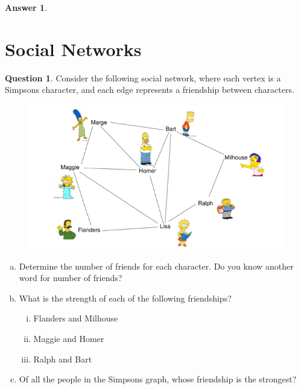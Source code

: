 \documentclass[article, 12pt]{article}
\theoremstyle{definition}
\newtheorem{question}{Question}
\newtheorem{answer}{Answer}
\begin{document}
\begin{answer}
\begin{figure}[H]
\begin{minipage}[b]{0.4\linewidth}
            \end{minipage}
        \end{figure}
    \end{answer}
    \section{Social Networks}
    \begin{question}
        Consider the following social network, where each vertex is a Simpsons character, and each edge represents a friendship between characters.
        \begin{figure}[H]
            \centering
            \includegraphics[width=0.8\linewidth]{simpsons.png}
        \end{figure}
        \begin{enumerate}[(a)]
            \item Determine the number of friends for each character. Do you know another word for number of friends?
            \item What is the strength of each of the following friendships?
            \begin{enumerate}[(i)]
                \item Flanders and Milhouse
                \item Maggie and Homer
                \item Ralph and Bart
            \end{enumerate}
            \item Of all the people in the Simpsons graph, whose friendship is the strongest?
        \end{enumerate}
    \end{question}
\end{document}
